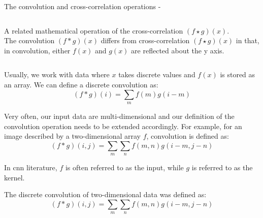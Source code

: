 \begin{frame}[t,allowframebreaks]{The convolution and cross-correlation operations -}
\begin{columns}
\begin{column}{0.55\textwidth}
            A related mathematical operation of the 
            \gls{cross-correlation} $(f \star g) (x)$.\\
            \vspace{0.2cm}
            The \gls{convolution} $(f \ast g) (x)$ differs from 
            \gls{cross-correlation} $(f \star g) (x)$
            in that, in \gls{convolution}, 
            either $f(x)$ and $g(x)$ are reflected about the y axis.\\
        \end{column}
    \end{columns}

    \framebreak

    Usually, we work with data where $x$ takes discrete values 
    and $f(x)$ is stored as an array.
    We can define a discrete \gls{convolution} as:
    \begin{equation}
        (f \ast g) (i) = 
          \sum_{m} 
            f(m) g(i-m)
        \label{eq:convolution_disc1d_1}
    \end{equation}        

    Very often, our input data are multi-dimensional 
    and our definition of the \gls{convolution} operation needs to be extended accordingly.
    For example, for an image described by a two-dimensional array $f$,
    \gls{convolution} is defined as:
    \begin{equation}
        (f \ast g) (i,j) = 
          \sum_{m} \sum_{n} 
          f(m,n) g(i-m, j-n)
        \label{eq:convolution_disc2d_1}
    \end{equation}        

    In \gls{cnn} literature,
    $f$ is often referred to as the input, 
    while $g$ is referred to as the kernel.

    \framebreak
   
    The discrete \gls{convolution}
    of two-dimensional data was defined as:
    \begin{equation*}
        (f \ast g) (i,j) = 
          \sum_{m} \sum_{n}
          f(m,n) g(i-m, j-n)
        \label{eq:convolution_disc2d_1}
    \end{equation*}        


\end{frame}
